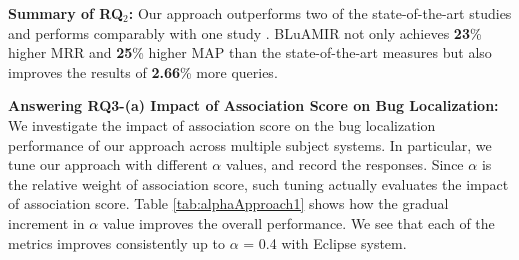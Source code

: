 \documentclass[sigconf,review,anonymous]{acmart}
\begin{document}
\begin{framed}
	\noindent
	\textbf{Summary of RQ$_2$:} Our approach outperforms two of the state-of-the-art studies \cite{Nguyen,Jian} and performs comparably with one study \cite{Saha}. BLuAMIR not only achieves \textbf{23}\% higher MRR and \textbf{25}\% higher MAP than the state-of-the-art measures but also improves the results of \textbf{2.66}\% more queries.
\end{framed}

\textbf{Answering RQ3-(a) Impact of Association Score on Bug Localization:} We investigate the impact of association score on the bug localization performance of our approach across multiple subject systems. 
In particular, we tune our approach with different $\alpha$ values, and record the responses. Since $\alpha$ is the relative weight of association score, such tuning actually evaluates the impact of association score.  
Table \ref{tab:alphaApproach1} shows how the gradual increment in $\alpha$ value improves the overall performance. We see that each of the metrics improves consistently up to $\alpha$ = 0.4 with Eclipse system. 
\end{document}
